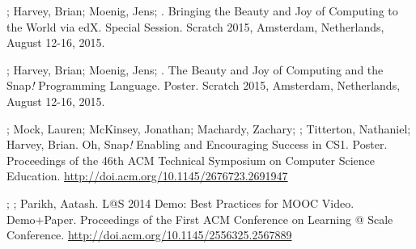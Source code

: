 \begin{etaremune}
    \item{\dan; Harvey, Brian; Moenig, Jens; \me. Bringing the Beauty and Joy of Computing to the World via edX. Special Session. Scratch 2015, Amsterdam, Netherlands, August 12-16, 2015.}

    \item{\dan; Harvey, Brian; Moenig, Jens; \me. The Beauty and Joy of Computing and the Snap\textit{!} Programming Language. Poster. Scratch 2015, Amsterdam, Netherlands, August 12-16, 2015.}

    \item{\me; Mock, Lauren; McKinsey, Jonathan; Machardy, Zachary; \dan; Titterton, Nathaniel; Harvey, Brian. Oh, Snap\textit{!} Enabling and Encouraging Success in CS1. Poster. Proceedings of the 46th ACM Technical Symposium on Computer Science Education.} \newline\href{http://doi.acm.org/10.1145/2676723.2691947}{http://doi.acm.org/10.1145/2676723.2691947}
    

    \item{\dan; \me; Parikh, Aatash. L@S 2014 Demo: Best Practices for MOOC Video. Demo+Paper. Proceedings of the First ACM Conference on Learning @ Scale Conference.} \href{http://doi.acm.org/10.1145/2556325.2567889}{http://doi.acm.org/10.1145/2556325.2567889}

\end{etaremune}

